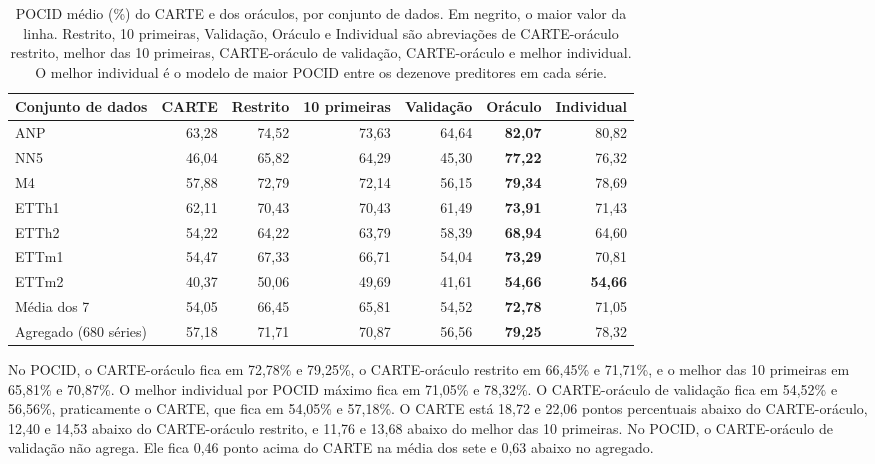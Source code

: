 \begin{table}[H]
\centering
\footnotesize
\setlength{\tabcolsep}{3pt}
\caption[POCID do CARTE e dos oráculos.]{POCID médio (\%) do CARTE e dos oráculos, por conjunto de dados. Em negrito, o maior valor da linha. Restrito, 10 primeiras, Validação, Oráculo e Individual são abreviações de CARTE-oráculo restrito, melhor das 10 primeiras, CARTE-oráculo de validação, CARTE-oráculo e melhor individual. O melhor individual é o modelo de maior POCID entre os dezenove preditores em cada série.}
\label{tab:ablacao-carte-oraculo-pocid}
\begin{tabular}{@{}lrrrrrr@{}}
\toprule
\textbf{Conjunto de dados} & \textbf{CARTE} & \textbf{Restrito} & \textbf{10 primeiras} & \textbf{Validação} & \textbf{Oráculo} & \textbf{Individual} \\
\midrule
ANP    & 63,28 & 74,52 & 73,63 & 64,64 & \textbf{82,07} & 80,82 \\
NN5    & 46,04 & 65,82 & 64,29 & 45,30 & \textbf{77,22} & 76,32 \\
M4     & 57,88 & 72,79 & 72,14 & 56,15 & \textbf{79,34} & 78,69 \\
ETTh1  & 62,11 & 70,43 & 70,43 & 61,49 & \textbf{73,91} & 71,43 \\
ETTh2  & 54,22 & 64,22 & 63,79 & 58,39 & \textbf{68,94} & 64,60 \\
ETTm1  & 54,47 & 67,33 & 66,71 & 54,04 & \textbf{73,29} & 70,81 \\
ETTm2  & 40,37 & 50,06 & 49,69 & 41,61 & \textbf{54,66} & \textbf{54,66} \\
\midrule
Média dos 7 & 54,05 & 66,45 & 65,81 & 54,52 & \textbf{72,78} & 71,05 \\
Agregado (680 séries) & 57,18 & 71,71 & 70,87 & 56,56 & \textbf{79,25} & 78,32 \\
\bottomrule
\end{tabular}
\end{table}

No POCID, o CARTE-oráculo fica em 72,78\% e 79,25\%, o CARTE-oráculo restrito em 66,45\% e 71,71\%, e o melhor das 10 primeiras em 65,81\% e 70,87\%. O melhor individual por POCID máximo fica em 71,05\% e 78,32\%. O CARTE-oráculo de validação fica em 54,52\% e 56,56\%, praticamente o CARTE, que fica em 54,05\% e 57,18\%. O CARTE está 18,72 e 22,06 pontos percentuais abaixo do CARTE-oráculo, 12,40 e 14,53 abaixo do CARTE-oráculo restrito, e 11,76 e 13,68 abaixo do melhor das 10 primeiras. No POCID, o CARTE-oráculo de validação não agrega. Ele fica 0,46 ponto acima do CARTE na média dos sete e 0,63 abaixo no agregado.

